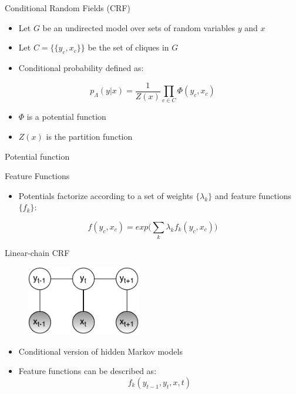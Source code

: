 \documentclass[presentation,bigger]{beamer}
\begin{document}
\begin{frame}[label={sec:orgheadline7}]{Conditional Random Fields (CRF)}
\begin{definition}[CRF]
\begin{itemize}
\item Let \(G\) be an undirected model over sets of random variables \(y\) and \(x\)
\item Let \(C = \{\{y_c, x_c\}\}\) be the set of cliques in \(G\)
\item Conditional probability defined as:
\end{itemize}
\[ p_\Lambda(y|x) = \dfrac{1}{Z(x)}\prod_{c \in C} \Phi (y_c, x_c) \]
\begin{itemize}
\item \(\Phi\) is a potential function
\item \(Z(x)\) is the partition function
\end{itemize}
\end{definition}
\end{frame}
\begin{frame}[label={sec:orgheadline8}]{Potential function}
\begin{block}{Feature Functions}
\begin{itemize}
\item Potentials factorize according to a set of weights \(\{\lambda_k\}\) and feature functions \(\{f_k\}\):
\end{itemize}
\[ f(y_c,x_c) = exp\Bigg(\sum_k \lambda_kf_k(y_c,x_c)\Bigg) \]
\end{block}
\end{frame}
\begin{frame}[label={sec:orgheadline9}]{Linear-chain CRF}
\begin{figure}[htb]
\centering
\includegraphics[width=5cm]{figures/LCRF.pdf}
\end{figure}
\begin{itemize}
\item Conditional version of hidden Markov models
\item Feature functions can be described as:
\[ f_k(y_{t-1},y_t,x,t) \]
\end{itemize}
\end{frame}
\end{document}
